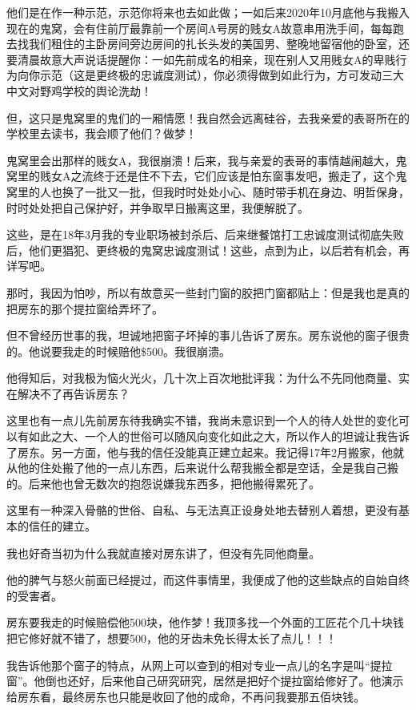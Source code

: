 \documentclass[9pt, b5paper]{article}
\begin{document}
他们是在作一种示范，示范你将来也去如此做；一如后来2020年10月底他与我搬入现在的鬼窝，会有住前厅最靠前一个房间A号房的贱女A故意串用洗手间，每每跑去找我们租住的主卧房间旁边房间的扎长头发的美国男、整晚地留宿他的卧室，还要清晨故意大声说话提醒你：一如先前成名的相亲，现在别人又用贱女A的卑贱行为向你示范（这是更终极的忠诚度测试），你必须得做到如此行为，方可发动三大中文对野鸡学校的舆论洗劫！

但，这只是鬼窝里的鬼们的一厢情愿！我自然会远离硅谷，去我亲爱的表哥所在的学校里去读书，我会顺了他们？做梦！

鬼窝里会出那样的贱女A，我很崩溃！后来，我与亲爱的表哥的事情越闹越大，鬼窝里的贱女A之流终于还是住不下去，它们应该是怕东窗事发吧，搬走了，这个鬼窝里的人也换了一批又一批，但我时时处处小心、随时带手机在身边、明哲保身，时时处处把自己保护好，并争取早日搬离这里，我便解脱了。

这些，是在18年3月我的专业职场被封杀后、后来继餐馆打工忠诚度测试彻底失败后，他们更猖犯、更终极的鬼窝忠诚度测试！这些，点到为止，以后若有机会，再详写吧。 

那时，我因为怕吵，所以有故意买一些封门窗的胶把门窗都贴上：但是我也是真的把房东的那个提拉窗给弄坏了。

但不曾经历世事的我，坦诚地把窗子坏掉的事儿告诉了房东。房东说他的窗子很贵的。他说要我走的时候赔他\$500。我很崩溃。

他得知后，对我极为恼火光火，几十次上百次地批评我：为什么不先同他商量、实在解决不了再告诉房东？

这里也有一点儿先前房东待我确实不错，我尚未意识到一个人的待人处世的变化可以有如此之大、一个人的世俗可以随风向变化如此之大，所以作人的坦诚让我告诉了房东。另一方面，他与我的信任没能真正建立起来。我记得17年2月搬家，他就从他的住处搬了他的一点儿东西，后来说什么帮我搬全都是空话，全是我自己搬的。后来他也曾无数次的抱怨说嫌我东西多，把他搬得累死了。

这里有一种深入骨骼的世俗、自私、与无法真正设身处地去替别人着想，更没有基本的信任的建立。

我也好奇当初为什么我就直接对房东讲了，但没有先同他商量。

他的脾气与怒火前面已经提过，而这件事情里，我便成了他的这些缺点的自始自终的受害者。 

房东要我走的时候赔偿他500块，他作梦！我顶多找一个外面的工匠花个几十块钱把它修好就不错了，想要500，他的牙齿未免长得太长了点儿！！！

我告诉他那个窗子的特点，从网上可以查到的相对专业一点儿的名字是叫“提拉窗”。他倒也还好，后来他自己研究研究，居然是把好个提拉窗给修好了。他演示给房东看，最终房东也只能是收回了他的成命，不再问我要那五佰块钱。 
\end{document}
